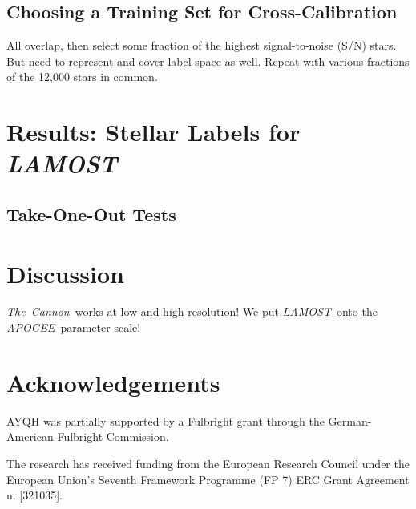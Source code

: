 \documentclass[12pt, preprint]{aastex}
\newcommand{\tc}{\textsl{The~Cannon}}
\newcommand{\apogee}{\textsl{APOGEE}}
\newcommand{\lamost}{\textsl{LAMOST}}
\begin{document}
\subsection{Choosing a Training Set for Cross-Calibration}

All overlap, then select some fraction of the highest signal-to-noise (S/N) 
stars. But need to represent and cover label space as well. Repeat with 
various fractions of the 12,000 stars in common.

\section{Results: Stellar Labels for \lamost}

\subsection{Take-One-Out Tests}

\section{Discussion}

\tc\ works at low and high resolution! We put \lamost\ onto the \apogee\ 
parameter scale!

\section{Acknowledgements}

AYQH was partially supported by a Fulbright grant through the German-American
Fulbright Commission.

The research has received funding from the European Research Council under the 
European Union's Seventh Framework Programme (FP 7) ERC Grant Agreement n.
[321035].
\end{document}
